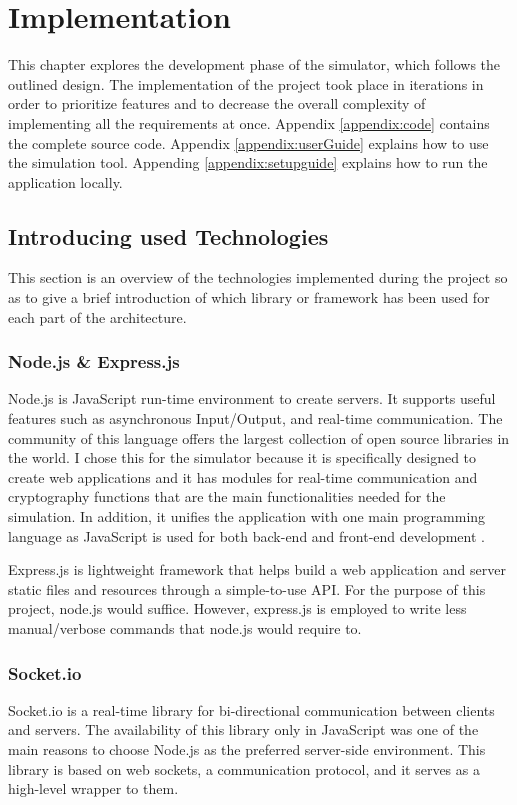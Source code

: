 \chapter{Implementation} \label{chapter:implementation}
This chapter explores the development phase of the simulator, which follows the outlined design. The implementation of the project took place in iterations in order to prioritize features and to decrease the overall complexity of implementing all the requirements at once. Appendix \ref{appendix:code} contains the complete source code. Appendix \ref{appendix:userGuide} explains how to use the simulation tool. Appending \ref{appendix:setupguide} explains how to run the application locally.


\section{Introducing used Technologies}
This section is an overview of the technologies implemented during the project so as to give a brief introduction of which library or framework has been used for each part of the architecture.


\subsection{Node.js \& Express.js}
Node.js is JavaScript run-time environment to create servers. It supports useful features such as asynchronous Input/Output, and real-time communication. The community of this language offers the largest collection of open source libraries in the world. I chose this for the simulator because it is specifically designed to create web applications and it has modules for real-time communication and cryptography functions that are the main functionalities needed for the simulation. In addition, it unifies the application with one main programming language as JavaScript is used for both back-end and front-end development \cite{Nodejs}. 

Express.js is lightweight framework that helps build a web application and server static files and resources through a simple-to-use API. For the purpose of this project, node.js would suffice. However, express.js is employed to write less manual/verbose commands that node.js would require to.

\subsection{Socket.io}
Socket.io is a real-time library for bi-directional communication between clients and servers. The availability of this library only in JavaScript was one of the main reasons to choose Node.js as the preferred server-side environment. This library is based on web sockets, a communication protocol, and it serves as a high-level wrapper to them.

